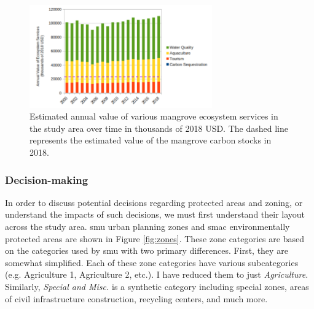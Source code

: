 \begin{figure}[!htb] 
\centering
\includegraphics[width=0.7\textwidth]{Figures/chap4/annual_ecosystem_services.png}
\caption[Annual Value of Mangrove Ecosystem Services]{Estimated annual value of various mangrove ecosystem services in the study area over time in thousands of 2018 USD. The dashed line represents the estimated value of the mangrove carbon stocks in 2018.}
\label{fig:annual_ecosystem_services}
\end{figure}


\subsubsection{Decision-making} \label{sec:rio-evdt-decision-results}

In order to discuss potential decisions regarding protected areas and zoning, or understand the impacts of such decisions, we must first understand their layout across the study area. \ac{smu} urban planning zones \cite{institutopereirapassosAreasProtegidas2021} and \ac{smac} environmentally protected areas \cite{institutopereirapassosSetores2022} are shown in Figure \ref{fig:zones}. These zone categories are based on the categories used by \ac{smu} with two primary differences. First, they are somewhat simplified. Each of these zone categories have various subcategories (e.g. Agriculture 1, Agriculture 2, etc.). I have reduced them to just \textit{Agriculture}. Similarly, \textit{Special and Misc.} is a synthetic category including special zones, areas of civil infrastructure construction, recycling centers, and much more. 

